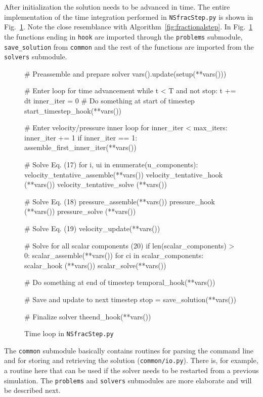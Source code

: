 \documentclass[final,3p,times,twocolumn]{elsarticle}
\newcommand{\inpyth}{\lstinline[style=inlinestyle]} %[]%
\newcounter{bla}
\begin{document}
After initialization the solution needs to be advanced in time. The entire implementation of the time integration performed in \inpyth{NSfracStep.py} is shown in Fig.~\ref{fig:timeloop}. Note the close resemblance with Algorithm~\ref{fig:fractionalstep}. In Fig.~\ref{fig:timeloop} the functions ending in \inpyth{hook}{} are imported through the \inpyth{problems} submodule, \inpyth{save_solution} from \inpyth{common} and the rest of the functions are imported from the \inpyth{solvers} submodule. 
\begin{figure}[ht!]
\begin{python}
# Preassemble and prepare solver
vars().update(setup(**vars()))

# Enter loop for time advancement
while t < T and not stop:
  t += dt
  inner_iter = 0
  # Do something at start of timestep    
  start_timestep_hook(**vars())
    
  # Enter velocity/pressure inner loop
  for inner_iter < max_iters:
    inner_iter += 1        
    if inner_iter == 1:
      assemble_first_inner_iter(**vars())
         
    # Solve Eq. (17)
    for i, ui in enumerate(u_components):
      velocity_tentative_assemble(**vars())
      velocity_tentative_hook    (**vars())
      velocity_tentative_solve   (**vars())
            
    # Solve Eq. (18)
    pressure_assemble(**vars())
    pressure_hook    (**vars())
    pressure_solve   (**vars())
         
  # Solve Eq. (19)
  velocity_update(**vars())
        
  # Solve for all scalar components (20)
  if len(scalar_components) > 0:
    scalar_assemble(**vars())
    for ci in scalar_components:    
      scalar_hook (**vars())
      scalar_solve(**vars())
        
  # Do something at end of timestep
  temporal_hook(**vars())
    
  # Save and update to next timestep
  stop = save_solution(**vars())

# Finalize solver
theend_hook(**vars())

\end{python}
\caption{Time loop in \inpyth{NSfracStep.py}{}}
\label{fig:timeloop}
\end{figure}

The \inpyth{common} submodule basically contains routines for parsing the command line and for storing and retrieving the solution (\inpyth{common/io.py}{}). There is, for example, a routine here that can be used if the solver needs to be restarted from a previous simulation. The \inpyth{problems} and \inpyth{solvers} submodules are more elaborate and will be described next.
\end{document}
